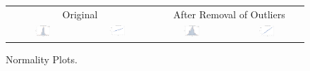 \documentclass[11pt]{scrartcl} %
\begin{document}
\begin{figure}[H] %
	\centering
	\begin{tabular}{p{} p{}p{}p{}}
\hline	
	\multicolumn{2}{|c|}{Original} &  \multicolumn{2}{|c|}{After Removal of Outliers} \\
		\multicolumn{1}{|c}{\includegraphics[width=0.23\textwidth]{../graphics/A1Norm1}} &
		\multicolumn{1}{c|}{\includegraphics[width=0.23\textwidth]{../graphics/A1qq1}} &
		\multicolumn{1}{|c}{\includegraphics[width=0.23\textwidth]{../graphics/A1Norm2}} &
		\multicolumn{1}{c|}{\includegraphics[width=0.23\textwidth]{../graphics/A1qq2}}\\
		\hline
	\end{tabular}		
	\caption{Normality Plots.} %
	\label{fig:A1QQ}
\end{figure}
\end{document}
